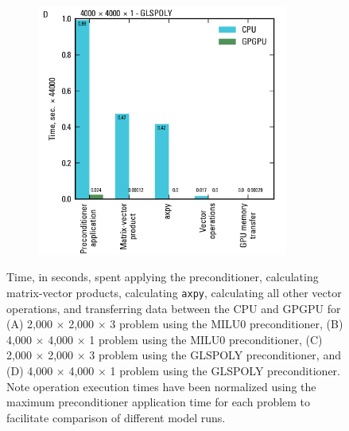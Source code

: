 \documentclass[12pt]{article}
\begin{document}
\begin{figure}[hp]
\begin{subfigure}[b]{0.5\textwidth}
	\end{subfigure}
	\begin{subfigure}[b]{0.5\textwidth}
		\centering
  		\includegraphics[width=8.25cm]{Figure4d.png}
	\end{subfigure}
 	\caption{Time, in seconds, spent applying the preconditioner, calculating matrix-vector products, calculating \texttt{axpy}, calculating all other vector operations, and transferring data between the CPU and GPGPU for (A) 2,000 $\times$ 2,000 $\times$ 3 problem using the MILU0 preconditioner, (B) 4,000 $\times$ 4,000 $\times$ 1 problem using the MILU0 preconditioner, (C) 2,000 $\times$ 2,000 $\times$ 3 problem using the GLSPOLY preconditioner, and (D) 4,000 $\times$ 4,000 $\times$ 1 problem using the GLSPOLY preconditioner. Note operation execution times have been normalized using the maximum preconditioner application time for each problem to facilitate comparison of different model runs.}
	\label{FigBLASOperationResults}
\end{figure}
\end{document}
